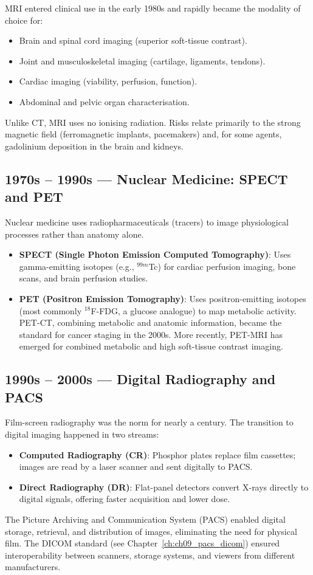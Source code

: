 MRI entered clinical use in the early 1980s and rapidly became the modality of choice for:
\begin{itemize}
    \item Brain and spinal cord imaging (superior soft-tissue contrast).
    \item Joint and musculoskeletal imaging (cartilage, ligaments, tendons).
    \item Cardiac imaging (viability, perfusion, function).
    \item Abdominal and pelvic organ characterisation.
\end{itemize}
Unlike CT, MRI uses no ionising radiation. Risks relate primarily to the strong magnetic field (ferromagnetic implants, pacemakers) and, for some agents, gadolinium deposition in the brain and kidneys.

\subsection*{1970s -- 1990s --- Nuclear Medicine: SPECT and PET}
Nuclear medicine uses radiopharmaceuticals (tracers) to image physiological processes rather than anatomy alone.
\begin{itemize}
    \item \textbf{SPECT (Single Photon Emission Computed Tomography)}: Uses gamma-emitting isotopes (e.g., $^{99m}$Tc) for cardiac perfusion imaging, bone scans, and brain perfusion studies.
    \item \textbf{PET (Positron Emission Tomography)}: Uses positron-emitting isotopes (most commonly $^{18}$F-FDG, a glucose analogue) to map metabolic activity. PET-CT, combining metabolic and anatomic information, became the standard for cancer staging in the 2000s. More recently, PET-MRI has emerged for combined metabolic and high soft-tissue contrast imaging.
\end{itemize}

\subsection*{1990s -- 2000s --- Digital Radiography and PACS}
Film-screen radiography was the norm for nearly a century. The transition to digital imaging happened in two streams:
\begin{itemize}
    \item \textbf{Computed Radiography (CR)}: Phosphor plates replace film cassettes; images are read by a laser scanner and sent digitally to PACS.
    \item \textbf{Direct Radiography (DR)}: Flat-panel detectors convert X-rays directly to digital signals, offering faster acquisition and lower dose.
\end{itemize}
The Picture Archiving and Communication System (PACS) enabled digital storage, retrieval, and distribution of images, eliminating the need for physical film. The DICOM standard (see Chapter~\ref{ch:ch09_pacs_dicom}) ensured interoperability between scanners, storage systems, and viewers from different manufacturers.

